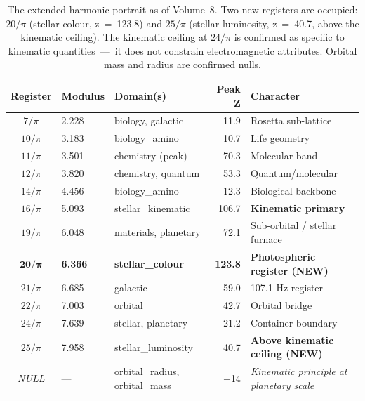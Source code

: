 \documentclass[11pt, letterpaper, openany]{book}
\begin{document}
\begin{table}[H]
\centering
\renewcommand{\arraystretch}{1.4}
\small
\begin{tabular}{|c|l|l|r|l|}
\hline
\rowcolor{kishblue!10}
\textbf{Register} & \textbf{Modulus} & \textbf{Domain(s)} & \textbf{Peak Z} & \textbf{Character} \\
\hline\hline
$7/\pi$   & 2.228 & biology, galactic      &   11.9 & Rosetta sub-lattice \\
$10/\pi$  & 3.183 & biology\_amino         &   10.7 & Life geometry \\
$11/\pi$  & 3.501 & chemistry (peak)       &   70.3 & Molecular band \\
$12/\pi$  & 3.820 & chemistry, quantum     &   53.3 & Quantum/molecular \\
$14/\pi$  & 4.456 & biology\_amino         &   12.3 & Biological backbone \\
$16/\pi$  & 5.093 & stellar\_kinematic     &  106.7 & \textbf{Kinematic primary} \\
$19/\pi$  & 6.048 & materials, planetary   &   72.1 & Sub-orbital / stellar furnace \\
\rowcolor{colourgold!15}
$\mathbf{20/\pi}$ & \textbf{6.366} & \textbf{stellar\_colour} & \textbf{123.8} & \textbf{Photospheric register (NEW)} \\
$21/\pi$  & 6.685 & galactic               &   59.0 & 107.1 Hz register \\
$22/\pi$  & 7.003 & orbital                &   42.7 & Orbital bridge \\
$24/\pi$  & 7.639 & stellar, planetary     &   21.2 & Container boundary \\
\rowcolor{luminorange!10}
$25/\pi$  & 7.958 & stellar\_luminosity    &   40.7 & \textbf{Above kinematic ceiling (NEW)} \\
\hline
\rowcolor{gray!10}
\textit{NULL} & — & orbital\_radius, orbital\_mass & $-$14 & \textit{Kinematic principle at planetary scale} \\
\hline
\end{tabular}
\caption{The extended harmonic portrait as of Volume~8. Two new registers are
occupied: $20/\pi$ (stellar colour, z~=~123.8) and $25/\pi$ (stellar luminosity,
z~=~40.7, above the kinematic ceiling). The kinematic ceiling at $24/\pi$ is
confirmed as specific to kinematic quantities~---~it does not constrain
electromagnetic attributes. Orbital mass and radius are confirmed nulls.}
\label{tab:v8_portrait}
\end{table}
\end{document}
